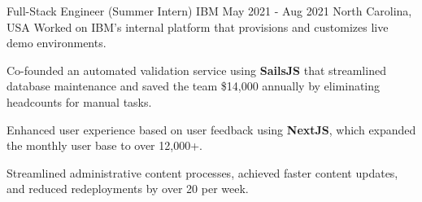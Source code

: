 \begin{cventries}
    \cventry
    {Full-Stack Engineer (Summer Intern)} %
    {IBM} %
    {May 2021 - Aug 2021} %
    {North Carolina, USA} %
    {Worked on IBM's internal platform that provisions and customizes live demo environments.}
    {
      \begin{cvitems} %
        \item {Co-founded an automated validation service using \textbf{SailsJS} that streamlined database maintenance and saved the team \$14,000 annually by eliminating headcounts for manual tasks.}
        \item {Enhanced user experience based on user feedback using \textbf{NextJS}, which expanded the monthly user base to over 12,000+.}
        \item {Streamlined administrative content processes, achieved faster content updates, and reduced redeployments by over 20 per week.}
      \end{cvitems}
    }



\end{cventries}
